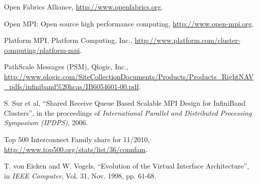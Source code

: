 \documentclass[conference]{IEEEtran}
\begin{document}
\begin{thebibliography}{30}
Open Fabrics Alliance, \url{http://www.openfabrics.org}.

Open MPI: Open source high performance computing, \url{http://www.open-mpi.org}.

Platform MPI, Platform Computing, Inc.,
\url{http://www.platform.com/cluster-computing/platform-mpi}.

PathScale Messages (PSM), Qlogic, Inc.,
\url{http://www.qlogic.com/SiteCollectionDocuments/Products/Products_RightNAV_pdfs/infiniband%20hcas/IB6054601-00.pdf}.

S. Sur et al, ``Shared Receive Queue Based Scalable MPI Design for InfiniBand Clusters'',
in the proceedings of \emph{International Parallel and Distributed Processing Symposium
(IPDPS)}, 2006.

Top 500 Interconnect Family share for 11/2010,
\url{http://www.top500.org/stats/list/36/connfam}.

T. von Eicken and W. Vogels, ``Evolution of the Virtual Interface Architecture'', in
\emph{IEEE Computer}, Vol. 31, Nov. 1998, pp. 61-68. 




\end{thebibliography}

\end{document}
